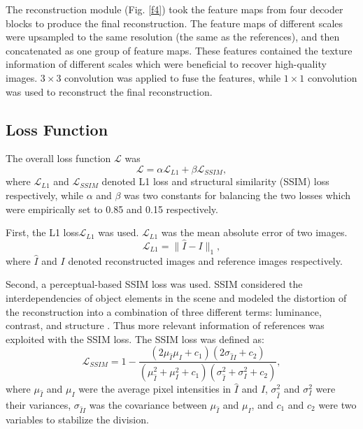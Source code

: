 \documentclass[conference]{IEEEtran}
\begin{document}
The reconstruction module (Fig. \ref{f4}) took the feature maps from four decoder blocks to produce the final reconstruction. The feature maps of different scales were upsampled to the same resolution (the same as the references), and then concatenated as one group of feature maps. These features contained the texture information of different scales which were beneficial to recover high-quality images. $3\times3$ convolution was applied to fuse the features, while $1\times1$ convolution was used to reconstruct the final reconstruction.

\subsection{Loss Function}

The overall loss function $\mathcal{L}$ was
\begin{equation}
\label{loss}
\mathcal{L}=\alpha \mathcal{L}_{L1}+\beta \mathcal{L}_{SSIM},
\end{equation}
where $\mathcal{L}_{L1}$ and $\mathcal{L}_{SSIM}$ denoted L1 loss and structural similarity (SSIM) loss respectively, while $\alpha$ and $\beta$ was two constants for balancing the two losses which were empirically set to 0.85 and 0.15 respectively. 

First, the L1 loss$\mathcal{L}_{L1}$ was used. $\mathcal{L}_{L1}$ was the mean absolute error of two images.
\begin{equation}
\label{l1}
\mathcal{L}_{L1}=\parallel \hat I - I \parallel _1,
\end{equation}
where $\hat I$ and $I$ denoted reconstructed images and reference images respectively. 

Second, a perceptual-based SSIM loss was used. SSIM considered the interdependencies of object elements in the scene and modeled the distortion of the reconstruction into a combination of three different terms: luminance, contrast, and structure \cite{wang2004image}. Thus more relevant information of references was exploited with the SSIM loss. The SSIM loss was defined as: 
\begin{equation}
\label{ssim}
\mathcal{L}_{SSIM}=1- \frac{(2\mu _{\hat I} \mu _{I} + c_1)(2\sigma _{\hat{I}{I}} + c_2)}{(\mu _{\hat I}^2 + \mu _I^2 + c_1)(\sigma _{\hat I}^2 + \sigma _I^2 + c_2)},
\end{equation}
where $\mu _{\hat I}$  and $\mu _I$ were the average pixel intensities in $\hat I$ and $I$, $\sigma _{\hat I}^2$  and $\sigma _I^2$ were their variances, $\sigma _{\hat II}$ was the covariance between $\mu _{\hat I}$  and $\mu _I$, and $c_1$ and $c_2$ were two variables to stabilize the division.
\end{document}
